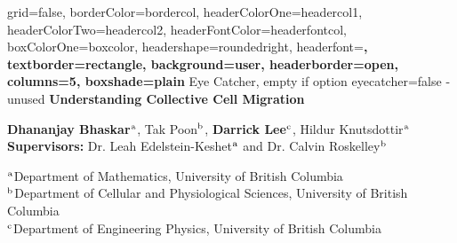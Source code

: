 \documentclass[a0paper,portrait,twocolumn]{baposter}
\begin{document}
\begin{poster}{
	grid=false,
	borderColor=bordercol,
	headerColorOne=headercol1,
	headerColorTwo=headercol2,
	headerFontColor=headerfontcol,
	boxColorOne=boxcolor,
	headershape=roundedright,
	headerfont=\Large\sf\bf,
	textborder=rectangle,
	background=user,
	headerborder=open,
	columns=5,
	boxshade=plain
}
{
	Eye Catcher, empty if option eyecatcher=false - unused
}
{\sf\bf
	Understanding Collective Cell Migration
}
{
	\vspace{0.3em}
	\textbf{Dhananjay Bhaskar}$^{\small \textrm{a}}$, Tak Poon$^{\small \textrm{b}}$, \textbf{Darrick Lee}$^{\small \textrm{c}}$, Hildur Knutsdottir$^{\small \textrm{a}}$\\
	\vspace{-0.1em}
	\textbf{Supervisors:} Dr. Leah Edelstein-Keshet$^{\small \textrm{a}}$ and Dr. Calvin Roskelley$^{\small \textrm{b}}$\\	
	\vspace{0.3em}
	
	{\scriptsize $^{\small \textrm{a}}$Department of Mathematics, University of British Columbia\\
	$^{\small \textrm{b}}$Department of Cellular and Physiological Sciences, University of British Columbia\\ 
	$^{\small \textrm{c}}$Department of Engineering Physics, University of British Columbia\\
	}
}
{
\setlength\fboxrule{0pt}
}



\end{poster}
\end{document}
